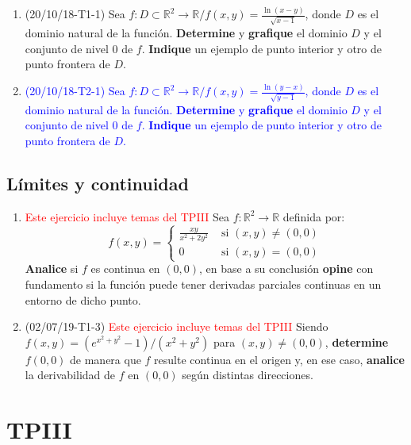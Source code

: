 \documentclass[12pt,a4paper]{article}
\renewcommand{\b}[1]{\textbf{#1}}
\newcommand{\red}[1]{\textcolor{red}{#1}}
\newcommand{\blue}[1]{\textcolor{blue}{#1}}
\newcommand{\R}{\mathbb{R}}
\begin{document}
\begin{enumerate}
	\item (20/10/18-T1-1) Sea $f:D\subset\R^2\rightarrow\R / f(x, y)=\frac{\ln{(x-y)}}{\sqrt{x-1}}$, donde $D$ es el dominio natural de la función. \textbf{Determine} y \textbf{grafique} el dominio $D$ y el conjunto   de nivel $0$ de $f$. \b{Indique} un ejemplo de punto interior y otro de punto frontera de $D$.
	
	\item \blue{(20/10/18-T2-1) Sea $f:D\subset\R^2\rightarrow\R / f(x, y)=\frac{\ln{(y-x)}}{\sqrt{y-1}}$, donde $D$ es el dominio natural de la función. \textbf{Determine} y \textbf{grafique} el dominio $D$ y el conjunto   de nivel $0$ de $f$. \b{Indique} un ejemplo de punto interior y otro de punto frontera de $D$.}
\end{enumerate}

\subsection{Límites y continuidad} \label{cont}
\begin{enumerate}
	\item \red{Este ejercicio incluye temas del TPIII} Sea $f:\R^2 \rightarrow \R$ definida por:
	\[f(x,y)= \begin{cases}
	\frac{xy}{x^2+2y^2} & \text{ si } (x, y)\neq(0,0)\\
	0 & \text{ si } (x, y)=(0,0)
	\end{cases}\]
	\b{Analice} si $f$ es continua en $(0,0)$, en base a su conclusión \b{opine} con fundamento si la función puede tener derivadas parciales continuas en un entorno de dicho punto. \label{ej:cont1}
	
	\item (02/07/19-T1-3) \red{Este ejercicio incluye temas del TPIII} Siendo $ f ( x, y ) = ( e^{x^2 + y^2} - 1 ) /( x^2 + y^2 ) $ para $ ( x, y ) \neq ( 0, 0 ) $, \b{determine} $ f ( 0, 0 ) $ de manera que $ f $ resulte continua en el origen y, en ese caso, \b{analice} la derivabilidad de $ f $ en $ ( 0, 0 ) $ según distintas direcciones. \label{ej:cont2}
\end{enumerate}
	
\section{TPIII}
\end{document}
